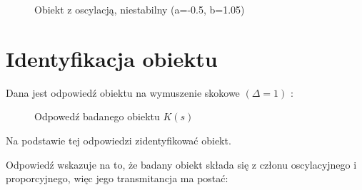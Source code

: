 \documentclass{article}
\begin{document}
\begin{figure}
\caption{Obiekt z oscylacją, niestabilny (a=-0.5, b=1.05)}
\end{figure}

\pagebreak

\section{Identyfikacja obiektu}
\par
Dana jest odpowiedź obiektu na wymuszenie skokowe \( ( \Delta = 1 )\) :


\begin{figure}[h]
\centering
{}
\caption{Odpowedź badanego obiektu \( K(s)\)}
\end{figure}

Na podstawie tej odpowiedzi zidentyfikować obiekt.

Odpowiedź wskazuje na to, że badany obiekt składa się z członu oscylacyjnego i proporcyjnego, więc jego transmitancja ma postać:
\end{document}
